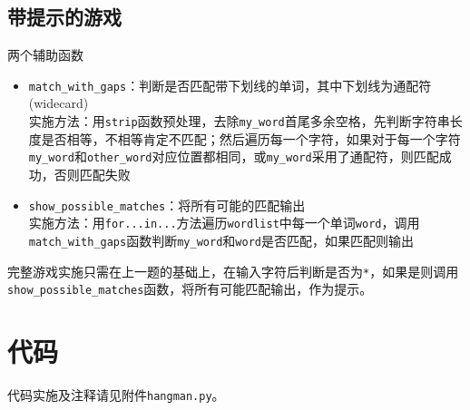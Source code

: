 \documentclass[logo,reportComp]{thesis}
\begin{document}
\subsection{带提示的游戏}
两个辅助函数
\begin{itemize}
	\item \verb'match_with_gaps'：判断是否匹配带下划线的单词，其中下划线为通配符(widecard)\\
	实施方法：用\verb'strip'函数预处理，去除\verb'my_word'首尾多余空格，先判断字符串长度是否相等，不相等肯定不匹配；然后遍历每一个字符，如果对于每一个字符\verb'my_word'和\verb'other_word'对应位置都相同，或\verb'my_word'采用了通配符，则匹配成功，否则匹配失败
	\item \verb'show_possible_matches'：将所有可能的匹配输出\\
	实施方法：用\verb'for...in...'方法遍历\verb'wordlist'中每一个单词\verb'word'，调用\verb'match_with_gaps'函数判断\verb'my_word'和\verb'word'是否匹配，如果匹配则输出
\end{itemize}

完整游戏实施只需在上一题的基础上，在输入字符后判断是否为\verb'*'，如果是则调用\verb'show_possible_matches'函数，将所有可能匹配输出，作为提示。

\section{代码}
代码实施及注释请见附件\verb'hangman.py'。
\end{document}
